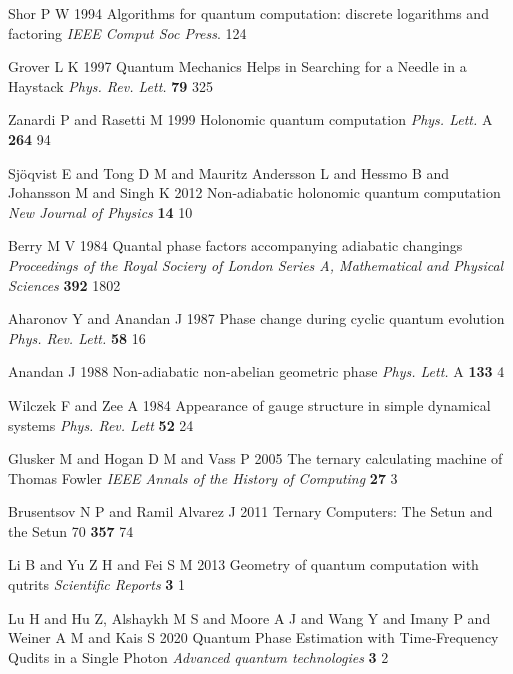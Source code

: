 \begin{enumerate}[label={[\arabic*]}]
\item Shor P W 1994 Algorithms for quantum computation: discrete logarithms and factoring \textit{IEEE Comput Soc Press}. 124

\item Grover L K 1997 Quantum Mechanics Helps in Searching for a Needle in a Haystack \textit{Phys. Rev. Lett.} \textbf{79} 325

\item Zanardi P and Rasetti M 1999 Holonomic quantum computation \textit{Phys. Lett.} A \textbf{264} 94

\item Sjöqvist E and Tong D M and Mauritz Andersson L and Hessmo B and Johansson M and Singh K 2012 Non-adiabatic holonomic quantum computation \textit{New Journal of Physics} \textbf{14} 10

\item Berry M V 1984 Quantal phase factors accompanying adiabatic changings \textit{Proceedings of the Royal Sociery of London Series A, Mathematical and Physical Sciences} \textbf{392} 1802

\item Aharonov Y and Anandan J 1987 Phase change during cyclic quantum evolution \textit{Phys. Rev. Lett.} \textbf{58} 16

\item Anandan J 1988 Non-adiabatic non-abelian geometric phase \textit{Phys. Lett.} A \textbf{133} 4

\item Wilczek F and Zee A 1984 Appearance of gauge structure in simple dynamical systems \textit{Phys. Rev. Lett} \textbf{52} 24

\item Glusker M and Hogan D M and Vass P 2005 The ternary calculating machine of Thomas Fowler \textit{IEEE Annals of the History of Computing} \textbf{27} 3

\item Brusentsov N P and Ramil Alvarez J 2011 Ternary Computers: The Setun and the Setun 70 \textbf{357} 74

\item Li B and Yu Z H and Fei S M 2013 Geometry of quantum computation with qutrits \textit{Scientific Reports} \textbf{3} 1

\item Lu H and Hu Z, Alshaykh M S and Moore A J and Wang Y and Imany P and Weiner A M and Kais S 2020 Quantum Phase Estimation with Time‐Frequency Qudits in a Single Photon \textit{Advanced quantum technologies} \textbf{3} 2


\end{enumerate}
